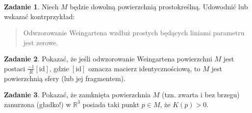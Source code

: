 \documentclass[a4paper,11pt]{article}
\theoremstyle{definition}\newtheorem{exercise}{Zadanie}
\theoremstyle{definition}\newtheorem{remark}{Uwaga}
\begin{document}
\begin{exercise}
Niech $M$ będzie dowolną powierzchnią prostokreślną. Udowodnić lub wskazać 
kontrprzykład: 
\begin{quote}
Odwzorowanie Weingartena wzdłuż prostych będących liniami parametru jest 
zerowe. 
\end{quote}

\end{exercise}


\begin{exercise}
Pokazać, że jeśli odwzorowanie Weingartena powierzchni $M$ jest postaci $\frac{-1	}{R}[\text{id}]$, gdzie $[\text{id}]$ oznacza macierz identycznościową, to $M$ jest powierzchnią sfery (lub jej fragmentem).
\end{exercise}

\begin{exercise}
 Pokazać, że zamknięta powierzchnia $M$ (tzn. zwarta i bez brzegu) zanurzona 
(gładko!) w $\mathbb{R}^3$ posiada taki punkt $p\in M$, że $K(p)> 0$.
\end{exercise}
\end{document}
